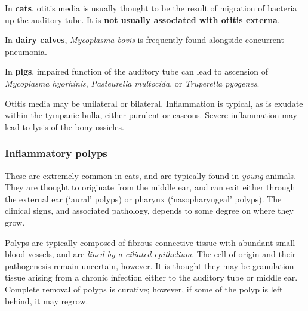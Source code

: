 \documentclass[
  openany]{article}
\begin{document}
In \textbf{cats}, otitis media is usually thought to be the result of migration of bacteria up the auditory tube. It is \textbf{not usually associated with otitis externa}.

In \textbf{dairy calves}, \emph{Mycoplasma bovis} is frequently found alongside concurrent pneumonia.

In \textbf{pigs}, impaired function of the auditory tube can lead to ascension of \emph{Mycoplasma hyorhinis}, \emph{Pasteurella multocida}, or \emph{Truperella pyogenes}.

Otitis media may be unilateral or bilateral. Inflammation is typical, as is exudate within the tympanic bulla, either purulent or caseous. Severe inflammation may lead to lysis of the bony ossicles.

\hypertarget{inflammatory-polyps}{%
\subsubsection{Inflammatory polyps}\label{inflammatory-polyps}}

These are extremely common in cats, and are typically found in \emph{young} animals. They are thought to originate from the middle ear, and can exit either through the external ear (`aural' polyps) or pharynx (`nasopharyngeal' polyps). The clinical signs, and associated pathology, depends to some degree on where they grow.

Polyps are typically composed of fibrous connective tissue with abundant small blood vessels, and are \emph{lined by a ciliated epithelium}. The cell of origin and their pathogenesis remain uncertain, however. It is thought they may be granulation tissue arising from a chronic infection either to the auditory tube or middle ear. Complete removal of polyps is curative; however, if some of the polyp is left behind, it may regrow.

  
\end{document}
